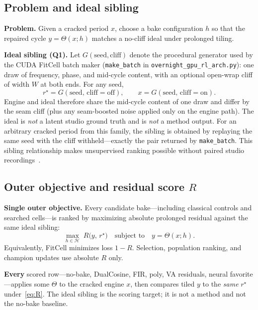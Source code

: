 \subsection{Problem and ideal sibling}
\label{sec:ideal-tile}

\textbf{Problem.} Given a cracked period $x$, choose a bake configuration $h$ so that the repaired cycle $y=\Theta(x;h)$ matches a no-cliff ideal under prolonged tiling.

\textbf{Ideal sibling (Q1).}
Let $G(\mathrm{seed},\mathrm{cliff})$ denote the procedural generator used by the CUDA FitCell batch maker
(\texttt{make\_batch} in \texttt{overnight\_gpu\_rl\_arch.py}): one draw of frequency, phase, and mid-cycle content, with an optional open-wrap cliff of width $W$ at both ends.
For any seed,
\begin{equation}
\label{eq:G-siblings}
r^{\star}=G(\mathrm{seed},\,\mathrm{cliff{=}off}),\qquad
x=G(\mathrm{seed},\,\mathrm{cliff{=}on}).
\end{equation}
Engine and ideal therefore share the mid-cycle content of one draw and differ by the seam cliff (plus any seam-boosted noise applied only on the engine path).
The ideal is \emph{not} a latent studio ground truth and is \emph{not} a method output.
For an arbitrary cracked period from this family, the sibling is obtained by replaying the same seed with the cliff withheld---exactly the pair returned by \texttt{make\_batch}.
This sibling relationship makes unsupervised ranking possible without paired studio recordings~\cite{lehtinen2018,kashyap2021n2n}.

\subsection{Outer objective and residual score $R$}
\label{sec:residual-score}

\textbf{Single outer objective.}
Every candidate bake---including classical controls and searched cells---is ranked by maximizing absolute prolonged residual against the same ideal sibling:
\begin{equation}
\label{eq:outer-obj}
\max_{h\in\mathcal{H}}\; R\bigl(y,\,r^{\star}\bigr)
\quad\text{subject to}\quad
y=\Theta(x;h).
\end{equation}
Equivalently, FitCell minimizes loss $1-R$. Selection, population ranking, and champion updates use absolute $R$ only.

\textbf{Every} scored row---no-bake, DualCosine, FIR, poly, VA residuals, neural favorite---applies some $\Theta$ to the cracked engine $x$, then compares tiled $y$ to the \emph{same} $r^{\star}$ under~\eqref{eq:R}.
The ideal sibling is the scoring target; it is not a method and not the no-bake baseline.

